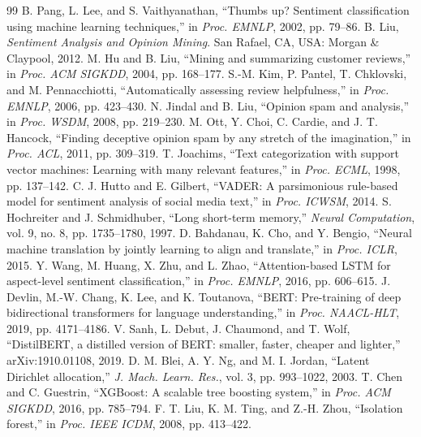 \documentclass[conference]{IEEEtran}
\begin{document}
\balance
\begin{thebibliography}{99}
 B. Pang, L. Lee, and S. Vaithyanathan, ``Thumbs up? Sentiment classification using machine learning techniques,'' in \emph{Proc. EMNLP}, 2002, pp. 79--86.
 B. Liu, \emph{Sentiment Analysis and Opinion Mining}. San Rafael, CA, USA: Morgan \& Claypool, 2012.
 M. Hu and B. Liu, ``Mining and summarizing customer reviews,'' in \emph{Proc. ACM SIGKDD}, 2004, pp. 168--177.
 S.-M. Kim, P. Pantel, T. Chklovski, and M. Pennacchiotti, ``Automatically assessing review helpfulness,'' in \emph{Proc. EMNLP}, 2006, pp. 423--430.
 N. Jindal and B. Liu, ``Opinion spam and analysis,'' in \emph{Proc. WSDM}, 2008, pp. 219--230.
 M. Ott, Y. Choi, C. Cardie, and J. T. Hancock, ``Finding deceptive opinion spam by any stretch of the imagination,'' in \emph{Proc. ACL}, 2011, pp. 309--319.
 T. Joachims, ``Text categorization with support vector machines: Learning with many relevant features,'' in \emph{Proc. ECML}, 1998, pp. 137--142.
 C. J. Hutto and E. Gilbert, ``VADER: A parsimonious rule-based model for sentiment analysis of social media text,'' in \emph{Proc. ICWSM}, 2014.
 S. Hochreiter and J. Schmidhuber, ``Long short-term memory,'' \emph{Neural Computation}, vol. 9, no. 8, pp. 1735--1780, 1997.
 D. Bahdanau, K. Cho, and Y. Bengio, ``Neural machine translation by jointly learning to align and translate,'' in \emph{Proc. ICLR}, 2015.
 Y. Wang, M. Huang, X. Zhu, and L. Zhao, ``Attention-based LSTM for aspect-level sentiment classification,'' in \emph{Proc. EMNLP}, 2016, pp. 606--615.
 J. Devlin, M.-W. Chang, K. Lee, and K. Toutanova, ``BERT: Pre-training of deep bidirectional transformers for language understanding,'' in \emph{Proc. NAACL-HLT}, 2019, pp. 4171--4186.
 V. Sanh, L. Debut, J. Chaumond, and T. Wolf, ``DistilBERT, a distilled version of BERT: smaller, faster, cheaper and lighter,'' arXiv:1910.01108, 2019.
 D. M. Blei, A. Y. Ng, and M. I. Jordan, ``Latent Dirichlet allocation,'' \emph{J. Mach. Learn. Res.}, vol. 3, pp. 993--1022, 2003.
 T. Chen and C. Guestrin, ``XGBoost: A scalable tree boosting system,'' in \emph{Proc. ACM SIGKDD}, 2016, pp. 785--794.
 F. T. Liu, K. M. Ting, and Z.-H. Zhou, ``Isolation forest,'' in \emph{Proc. IEEE ICDM}, 2008, pp. 413--422.

\end{thebibliography}
\end{document}
